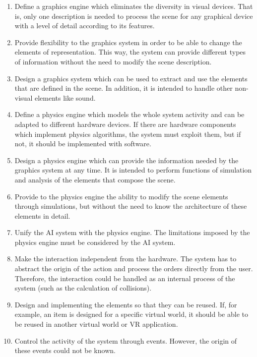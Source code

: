 \documentclass[10pt,journal,letterpaper,compsoc]{IEEEtran}
\begin{document}
\begin{enumerate}
    \item Define a graphics engine which eliminates the diversity in visual
devices. That is, only one description is needed to process the scene for any graphical device with
a level of detail according to its features.

    \item Provide flexibility to the graphics system in order to be
able to change the elements of representation. This way, the system can
provide different types of information without the need to modify the scene
description.

    \item Design a graphics system which can be used to extract and use the
elements that are defined in the scene. In addition, it is intended to handle other non-visual
elements like sound.

    \item Define a physics engine which models the whole system activity
and can be adapted to different hardware devices. If there are hardware components which implement
physics algorithms, the system must exploit them, but if not, it should be implemented with
software.

    \item Design a physics engine which can provide the information needed by the graphics system at any time. It is intended to perform functions of simulation and analysis of the elements that compose the scene.

    \item Provide to the physics engine the ability to modify the scene
elements through simulations, but without the need to know the architecture of these elements in
detail.

    \item Unify the AI system with the physics engine. The limitations
imposed by the physics engine must be considered by the AI system.

    \item Make the interaction independent from the hardware. The system has to abstract the origin of the action and process the orders directly from the user. Therefore, the interaction could be handled as an internal process of the system (such as the calculation of collisions).

    \item Design and implementing the elements so that they can be reused. If, for
example, an item is designed for a specific virtual world, it should be able to
be reused in another virtual world or VR application.

    \item Control the activity of the system through events. However, the origin of these events could not be known.

\end{enumerate}
\end{document}
